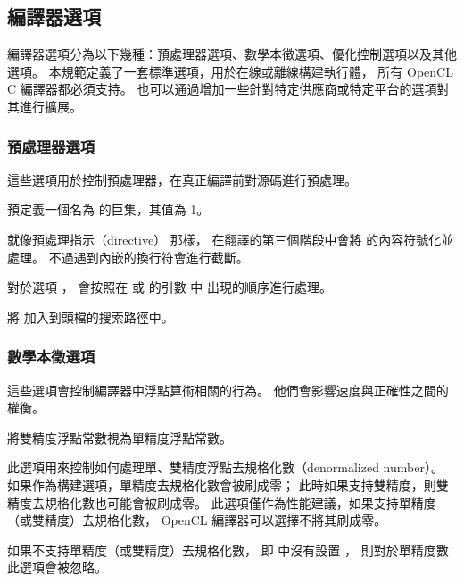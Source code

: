\subsection[sec:compilerOption]{編譯器選項}

編譯器選項分為以下幾種：預處理器選項、數學本徵選項、優化控制選項以及其他選項。
本規範定義了一套標準選項，用於在線或離線構建執行體，
所有 OpenCL C 編譯器都必須支持。
也可以通過增加一些針對特定供應商或特定平台的選項對其進行擴展。

\subsubsection[sec:preprocessorOption]{預處理器選項}

這些選項用於控制預處理器，在真正編譯前對源碼進行預處理。

預定義一個名為  的巨集，其值為 1。
\stopclOption

就像預處理指示（directive）  那樣，
在翻譯的第三個階段中會將  的內容符號化並處理。
不過遇到內嵌的換行符會進行截斷。
\stopclOption

對於選項 ，
會按照在  或  的引數  中
出現的順序進行處理。

將  加入到頭檔的搜索路徑中。
\stopclOption

\subsubsection[sec:MathIntrinsicsOption]{數學本徵選項}
這些選項會控制編譯器中浮點算術相關的行為。
他們會影響速度與正確性之間的權衡。

將雙精度浮點常數視為單精度浮點常數。
\stopclOption

此選項用來控制如何處理單、雙精度浮點去規格化數（denormalized number）。
如果作為構建選項，單精度去規格化數會被刷成零；
此時如果支持雙精度，則雙精度去規格化數也可能會被刷成零。
此選項僅作為性能建議，如果支持單精度（或雙精度）去規格化數，
OpenCL 編譯器可以選擇不將其刷成零。

如果不支持單精度（或雙精度）去規格化數，
即  中沒有設置 ，
則對於單精度數此選項會被忽略。

